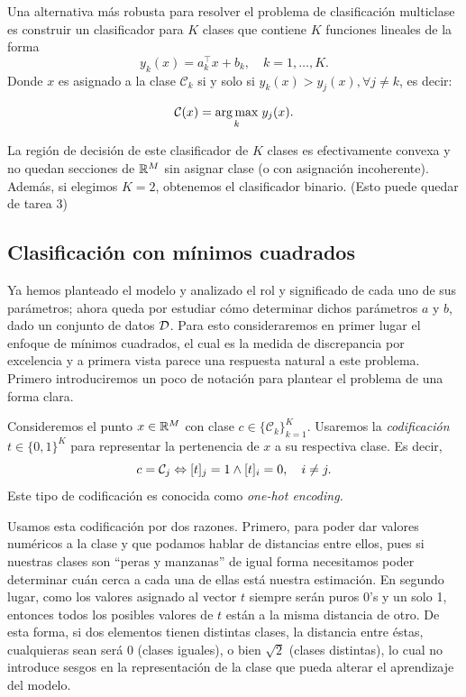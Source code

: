 Una alternativa más robusta para resolver el problema de clasificación multiclase es construir un clasificador para $K$ clases que contiene $K$ funciones lineales de la forma
\begin{equation}
	y_k(x) = a_k^\top x + b_k, \quad k=1,\ldots,K.
\end{equation}
Donde $x$ es asignado a la clase $\mathcal{C}_k$ si y solo si $y_k(x) > y_j(x), \forall j\neq k$, es decir:

\begin{equation}
	\mathcal{C}(x) = \underset{k}{\operatorname*{arg\,max}}\hspace{1mm} y_j(x).
\end{equation}

La región de decisión de este clasificador de $K$ clases es efectivamente convexa y no  quedan secciones de ${\mathbb R}^M$ sin asignar clase (o con asignación incoherente). Además, si elegimos $K=2$, obtenemos el clasificador  binario. (Esto puede quedar de tarea 3)

\subsection{Clasificación con mínimos cuadrados}

Ya hemos planteado el modelo y analizado el rol  y significado de cada uno de sus parámetros; ahora queda por estudiar cómo determinar dichos parámetros $a$ y $b$, dado un conjunto de datos ${\mathcal D}$. Para esto consideraremos en primer lugar el enfoque de mínimos cuadrados, el cual es la medida de discrepancia  por  excelencia  y a primera vista  parece una respuesta natural a este problema. Primero  introduciremos un poco de notación para plantear el problema de una forma clara.

Consideremos el  punto $x\in{\mathbb R}^M$ con clase $c\in\{\mathcal{C}_k\}_{k=1}^K$. Usaremos la \emph{codificación} $t \in\{0,1\}^K$ para representar la pertenencia de $x$ a su respectiva clase. Es decir, 
\begin{equation}
	c = {\mathcal C}_j \Leftrightarrow [t]_j=1 \wedge [t]_i=0, \quad i\neq j.
\end{equation}
Este tipo de codificación  es conocida como \emph{one-hot  encoding.}  

\begin{remark}
Usamos esta codificación por  dos razones. Primero, para poder dar valores numéricos a la clase y que  podamos hablar de distancias entre ellos, pues si nuestras clases son ``peras y manzanas'' de igual forma necesitamos poder determinar cuán cerca a cada una de ellas está nuestra estimación. En segundo  lugar, como los valores  asignado al vector $t$ siempre serán puros 0's y  un solo 1, entonces  todos los posibles  valores de $t$ están a la misma distancia de otro. De esta forma, si dos elementos tienen distintas clases, la distancia entre éstas, cualquieras sean será 0 (clases iguales), o bien $\sqrt{2}$ (clases distintas), lo cual no introduce sesgos en la representación de la clase que pueda alterar el aprendizaje del modelo.  	
\end{remark}

